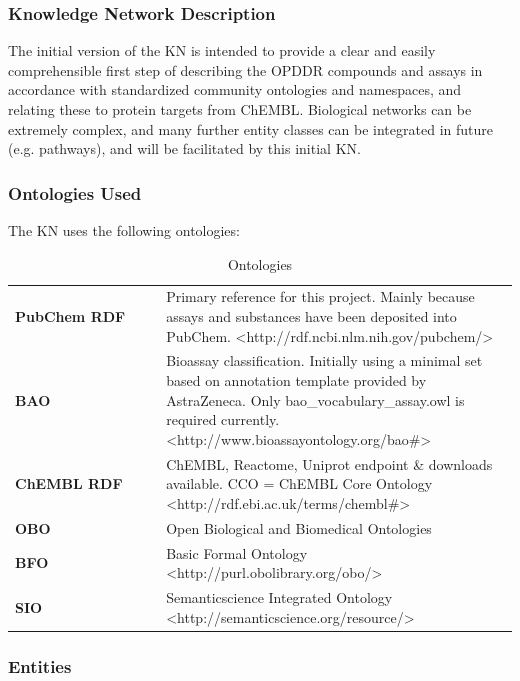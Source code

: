 \subsubsection{Knowledge Network Description}

The initial version of the KN is intended to provide a clear and easily comprehensible first step of describing the OPDDR compounds and assays in accordance with standardized community ontologies and namespaces, and relating these to protein targets from ChEMBL.  Biological networks can be extremely complex, and many further entity classes can be integrated in future (e.g. pathways), and will be facilitated by this initial KN.

\subsubsection{Ontologies Used}

The KN uses the following ontologies:

\begin{table}[]
\caption{Ontologies}
\label{tab:opddr_01}
\centering
\begin{tabular}{p{0.3\linewidth}p{0.7\linewidth}}
\hline
\textbf{PubChem RDF} & Primary reference for this project.  Mainly because assays and substances have been deposited into PubChem. 
\textless http://rdf.ncbi.nlm.nih.gov/pubchem/\textgreater \\
\textbf{BAO} & Bioassay classification.  Initially using a minimal set based on annotation template provided by AstraZeneca.  Only bao\_vocabulary\_assay.owl is required currently.
\textless http://www.bioassayontology.org/bao\#\textgreater \\
\textbf{ChEMBL RDF} & ChEMBL, Reactome, Uniprot endpoint \& downloads available.
CCO = ChEMBL Core Ontology
\textless http://rdf.ebi.ac.uk/terms/chembl\#\textgreater \\
\textbf{OBO} & Open Biological and Biomedical Ontologies \\
\textbf{BFO} &  Basic Formal Ontology \textless http://purl.obolibrary.org/obo/\textgreater \\
\textbf{SIO} & Semanticscience Integrated Ontology
\textless http://semanticscience.org/resource/\textgreater \\
\end{tabular}
\end{table}


\subsubsection{Entities}

